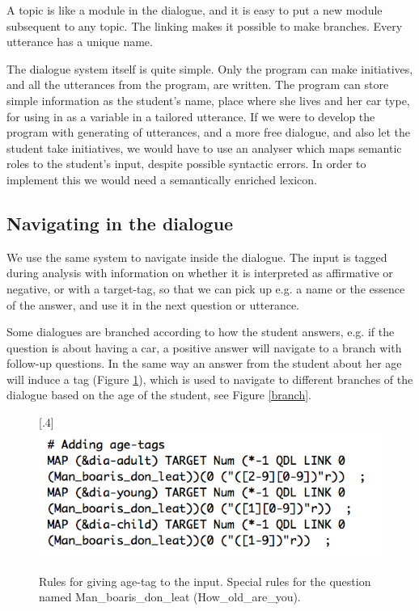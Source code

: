 \documentclass[11pt]{article}
\begin{document}
A topic is like a module in the dialogue, and it is easy to put a new module subsequent to any topic. The linking makes it possible to make branches. Every utterance has a unique name.  

The dialogue system itself is quite simple. Only the program can make initiatives, and all the utterances from the program, are written. The program can store simple information as the student's name, place where she lives and her car type, for using in as a variable in a tailored utterance. If we were to develop the program with generating of utterances, and a more free dialogue, and also let the student take initiatives, we would have to use an analyser which maps semantic roles to the student's input, despite possible syntactic errors. In order to implement this we would need a semantically enriched lexicon.

\subsection{Navigating in the dialogue}\label{navigation}
We use the same system to navigate inside the dialogue. The input is tagged during analysis with information on whether it is interpreted as affirmative or negative, or with a target-tag, so that we can pick up e.g. a name or the essence of the answer, and use it in the next question or utterance. 

Some dialogues are branched according to how the student answers, e.g. if the question is about having a car, a positive answer will navigate to a branch with follow-up questions. In the same way an answer from the student about her age will induce a tag (Figure \ref{age}), which is used to navigate to different branches of the dialogue based on the age of the student, see Figure \ref{branch}.


\begin{figure}[htbp]
\begin{center}
\scalebox{.4}[.4]{\includegraphics{presentation/img/picking_age2.png}}\\
\caption{Rules for giving age-tag to the input. Special rules for the question named Man\_boaris\_don\_leat (How\_old\_are\_you).}
\label{age}
\end{center}
\end{figure}
\end{document}
